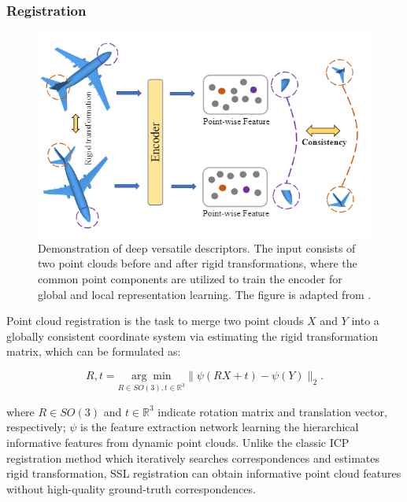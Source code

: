\documentclass[a4paper,fleqn]{cas-dc}
\begin{document}
\subsubsection{Registration}
\begin{figure}[htbp]
    \centering
    \includegraphics[width=0.97\linewidth]{DVD.png}
    \caption{Demonstration of deep versatile descriptors. The input consists of two point clouds before and after rigid transformations, where the common point components are utilized to train the encoder for global and local representation learning. The figure is adapted from \citep{liu2022self}.}  
    \label{fig:DVD}
\end{figure}


Point cloud registration is the task to merge two point clouds $X$ and $Y$ into a globally consistent coordinate system via estimating the rigid transformation matrix, which can be formulated as:

\begin{equation}
    R, t=\underset{R \in S O(3), t \in \mathbb{R}^{3}}{\arg \min } \|\psi (R X + t) - \psi(Y) \|_{2} .
\end{equation}

where $R \in S O(3)$ and $t \in \mathbb{R}^{3}$ indicate rotation matrix and translation vector, respectively; $\psi$ is the feature extraction network learning the hierarchical informative features from dynamic point clouds. Unlike the classic ICP registration method \citep{besl1992method} which iteratively searches correspondences and estimates rigid transformation, SSL registration can obtain informative point cloud features without high-quality ground-truth correspondences.
\end{document}
